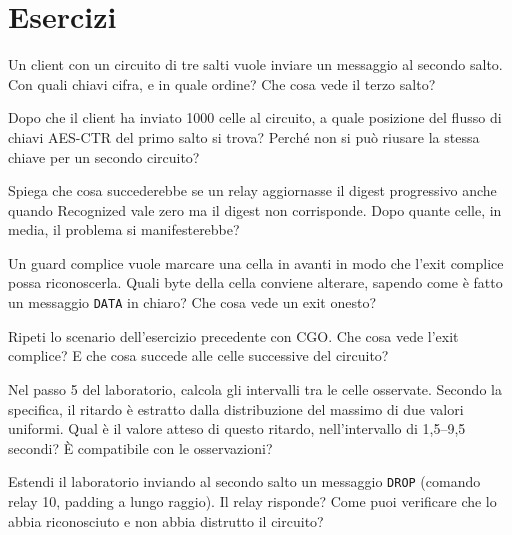 \section*{Esercizi}

\begin{esercizio}[1]\label{es:10-ordine}
Un client con un circuito di tre salti vuole inviare un messaggio al secondo salto. Con quali chiavi cifra, e in quale ordine? Che cosa vede il terzo salto?
\end{esercizio}

\begin{esercizio}[1]\label{es:10-contatore}
Dopo che il client ha inviato 1000 celle al circuito, a quale posizione del flusso di chiavi AES-CTR del primo salto si trova? Perché non si può riusare la stessa chiave per un secondo circuito?
\end{esercizio}

\begin{esercizio}[2]\label{es:10-falso}
Spiega che cosa succederebbe se un relay aggiornasse il digest progressivo anche quando Recognized vale zero ma il digest non corrisponde. Dopo quante celle, in media, il problema si manifesterebbe?
\end{esercizio}

\begin{esercizio}[2]\label{es:10-tag}
Un guard complice vuole marcare una cella in avanti in modo che l'exit complice possa riconoscerla. Quali byte della cella conviene alterare, sapendo come è fatto un messaggio \texttt{DATA} in chiaro? Che cosa vede un exit onesto?
\end{esercizio}

\begin{esercizio}[2]\label{es:10-cgo-tag}
Ripeti lo scenario dell'esercizio precedente con CGO. Che cosa vede l'exit complice? E che cosa succede alle celle successive del circuito?
\end{esercizio}

\begin{esercizio}[2]\label{es:10-padding}
Nel passo 5 del laboratorio, calcola gli intervalli tra le celle  osservate. Secondo la specifica, il ritardo è estratto dalla distribuzione del massimo di due valori uniformi. Qual è il valore atteso di questo ritardo, nell'intervallo di 1,5--9,5 secondi? È compatibile con le osservazioni?
\end{esercizio}

\begin{esercizio}[3]\label{es:10-drop}
Estendi il laboratorio inviando al secondo salto un messaggio \texttt{DROP} (comando relay 10, padding a lungo raggio). Il relay risponde? Come puoi verificare che lo abbia riconosciuto e non abbia distrutto il circuito?
\end{esercizio}

